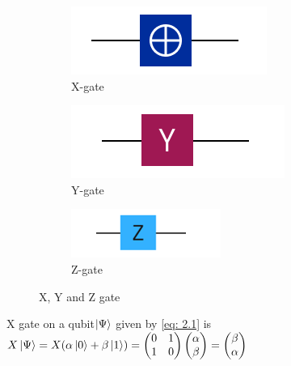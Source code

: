 \begin{figure}[H]
  \centering
  \begin{subfigure}[b]{0.3\linewidth}
    \includegraphics[width=\linewidth]{figures/X-gate.PNG}
    \caption{X-gate}
  \end{subfigure}
  \begin{subfigure}[b]{0.3\linewidth}
    \includegraphics[width=\linewidth]{figures/Y-gate.PNG}
    \caption{Y-gate }
  \end{subfigure}
  \begin{subfigure}[b]{0.3\linewidth}
    \includegraphics[width=\linewidth]{figures/Z-gate.PNG}
    \caption{Z-gate }
  \end{subfigure}
  \caption{X, Y and Z gate}
  \label{fig:xyzgate}
\end{figure}

X gate on a qubit$\ket{\Psi}$ given by \eqref{eq: 2.1} is
\\$X\ket{\Psi} = X(\alpha\ket{0} + \beta\ket{1}) = \begin{pmatrix}0 &1 \\ 1 &0 \end{pmatrix}\begin{pmatrix}\alpha \\ \beta \end{pmatrix} = \begin{pmatrix}\beta \\ \alpha \end{pmatrix}$


